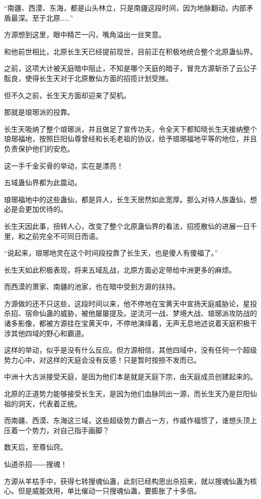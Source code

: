\begin{this_body}
“南疆、西漠、东海，都是山头林立，只是南疆这段时间，因为地脉翻动，内部矛盾最深。至于北原……”

方源想到这里，眼中精芒一闪，嘴角溢出一丝笑意。

和他前世相比，北原长生天已经提前现世，目前正在积极地统合整个北原蛊仙界。

之前，这项大计被天庭暗中阻止，不知是哪个天庭的暗子，冒充方源斩杀了云公子酝良，使得长生天对于北原散仙方面的招揽计划受挫。

但不久之前，长生天方面却迎来了契机。

那就是琅琊派的投靠。

长生天吸纳了整个琅琊派，并且做足了宣传功夫，令全天下都知晓长生天接纳整个琅琊福地，按照巨阳仙尊曾经和长毛老祖的协议，给予琅琊福地平等的地位，并且负责保护他们的安危。

这一手千金买骨的举动，实在是漂亮！

五域蛊仙界都为此震动。

琅琊福地中的这些蛊仙，都是异人，长生天居然如此宽厚。那么对待人族蛊仙，想必是会更加优待的。

长生天因此事，扭转人心，改变了整个北原蛊仙界的看法，招揽散仙的进展一日千里，和之前完全不可同日而语。

“说起来，琅琊地灵在这个时间段投靠了长生天，也是傻人有傻福了。”

长生天如此积极表现，将来五域乱战，北原方面必定带给中洲更多的麻烦。

而西漠的萧家、南疆的池家，也在暗中受到方源的扶持。

方源做的还不只这些，这段时间以来，他不停地在宝黄天中宣扬天庭威胁论，星投杀招、宿命仙蛊的威胁，被他屡屡提及。逆流河一战、梦境大战、琅琊派攻防战的诸多影像，都被方源挂在宝黄天中，不停地演绎着，无声无息地述说着天庭积极干涉其他四域的野心和霸道。

这样的举动，似乎是没有什么反应。但方源相信，其他四域中，没有任何一个超级势力心中，对这样的天庭会没有反感！只是暂时按捺不发而已。

中洲十大古派接受天庭，是因为他们本是就是天庭下宗，由天庭成员创建起来的。

北原的正道势力能够接受长生天，是因为他们血脉同出一源，而长生天乃是巨阳仙祖的洞天，代表着正统。

而南疆、西漠、东海这三域，这些超级势力霸占一方，作威作福惯了，谁想头顶上压着一个势力，对自己指手画脚？

数天后，至尊仙窍。

仙道杀招――搜魂！

方源从羊枯手中，获得七转搜魂仙蛊，此刻已经构思出杀招来，就以搜魂仙蛊为核心。但是威能效用，单比催动一只搜魂仙蛊，要膨胀了十多倍。


\end{this_body}
